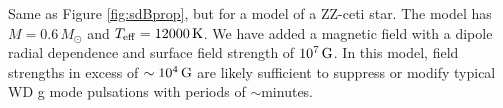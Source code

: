 \label{fig:WDProp}
Same as Figure \ref{fig:sdBprop}, but for a model of a ZZ-ceti star. The model has $M=0.6\,M_\odot$ and $T_{\rm eff} = 12000 \, {\rm K}$. We have added a magnetic field with a dipole radial dependence and surface field strength of $10^7 \, {\rm G}$. In this model, field strengths in excess of $\sim 10^4 \, {\rm G}$ are likely sufficient to suppress or modify typical WD g mode pulsations with periods of $\sim$minutes.